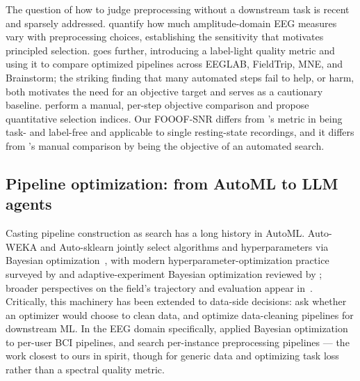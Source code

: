The question of how to judge preprocessing without a downstream task is recent and sparsely addressed. \citet{RobbinsEtAl2020} quantify how much amplitude-domain EEG measures vary with preprocessing choices, establishing the sensitivity that motivates principled selection. \citet{Delorme2023} goes further, introducing a label-light quality metric and using it to compare optimized pipelines across EEGLAB, FieldTrip, MNE, and Brainstorm; the striking finding that many automated steps fail to help, or harm, both motivates the need for an objective target and serves as a cautionary baseline. \citet{CoelliEtAl2023} perform a manual, per-step objective comparison and propose quantitative selection indices. Our FOOOF-SNR differs from \citet{Delorme2023}'s metric in being task- and label-free and applicable to single resting-state recordings, and it differs from \citet{CoelliEtAl2023}'s manual comparison by being the objective of an automated search.

\subsection{Pipeline optimization: from AutoML to LLM agents}
\label{sec:rw_optim}

Casting pipeline construction as search has a long history in AutoML. Auto-WEKA and Auto-sklearn jointly select algorithms and hyperparameters via Bayesian optimization~\cite{ThorntonEtAl2012, FeurerEtAl2015, FeurerEtAl2020}, with modern hyperparameter-optimization practice surveyed by \citet{BischlEtAl2023} and adaptive-experiment Bayesian optimization reviewed by \citet{GreenhillEtAl2020}; broader perspectives on the field's trajectory and evaluation appear in~\cite{SantuEtAl2020, CooneyEtAl2020}. Critically, this machinery has been extended to data-side decisions: \citet{NeutatzEtAl2022} ask whether an optimizer would choose to clean data, and \citet{SiddiqiEtAl2023} optimize data-cleaning pipelines for downstream ML. In the EEG domain specifically, \citet{BashashatiEtAl2016} applied Bayesian optimization to per-user BCI pipelines, and \citet{MartinezEtAl2023} search per-instance preprocessing pipelines --- the work closest to ours in spirit, though for generic data and optimizing task loss rather than a spectral quality metric.

